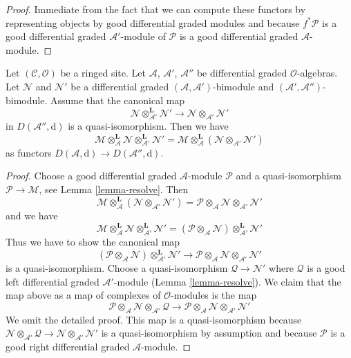 \begin{proof}
Immediate from the fact that we can compute these functors
by representing objects by good differential graded modules
and because $f^*\mathcal{P}$ is a good differential
graded $\mathcal{A}'$-module of $\mathcal{P}$ is a good
differential graded $\mathcal{A}$-module.
\end{proof}

\begin{lemma}
\label{lemma-compose-tensor}
Let $(\mathcal{C}, \mathcal{O})$ be a ringed site. Let
$\mathcal{A}$, $\mathcal{A}'$, $\mathcal{A}''$ be differential graded
$\mathcal{O}$-algebras. Let $\mathcal{N}$ and $\mathcal{N}'$ be a
differential graded $(\mathcal{A}, \mathcal{A}')$-bimodule
and $(\mathcal{A}', \mathcal{A}'')$-bimodule. Assume
that the canonical map
$$
\mathcal{N} \otimes_{\mathcal{A}'}^\mathbf{L} \mathcal{N}'
\longrightarrow
\mathcal{N} \otimes_{\mathcal{A}'} \mathcal{N}'
$$
in $D(\mathcal{A}'', \text{d})$ is a quasi-isomorphism.
Then we have
$$
\mathcal{M}
\otimes_\mathcal{A}^\mathbf{L} \mathcal{N} 
\otimes_{\mathcal{A}'}^\mathbf{L} \mathcal{N}'
=
\mathcal{M}
\otimes_\mathcal{A}^\mathbf{L}
(\mathcal{N} \otimes_{\mathcal{A}'} \mathcal{N}')
$$
as functors $D(\mathcal{A}, \text{d}) \to D(\mathcal{A}'', \text{d})$.
\end{lemma}

\begin{proof}
Choose a good differential graded $\mathcal{A}$-module
$\mathcal{P}$ and a quasi-isomorphism $\mathcal{P} \to \mathcal{M}$, see
Lemma \ref{lemma-resolve}. Then
$$
\mathcal{M}
\otimes_\mathcal{A}^\mathbf{L}
(\mathcal{N} \otimes_{\mathcal{A}'} \mathcal{N}') =
\mathcal{P} \otimes_\mathcal{A} \mathcal{N}
\otimes_{\mathcal{A}'} \mathcal{N}'
$$
and we have
$$
\mathcal{M}
\otimes_\mathcal{A}^\mathbf{L} \mathcal{N} 
\otimes_{\mathcal{A}'}^\mathbf{L} \mathcal{N}' =
(\mathcal{P} \otimes_\mathcal{A} \mathcal{N})
\otimes_{\mathcal{A}'}^\mathbf{L} \mathcal{N}'
$$
Thus we have to show the canonical map
$$
(\mathcal{P} \otimes_\mathcal{A} \mathcal{N})
\otimes_{\mathcal{A}'}^\mathbf{L} \mathcal{N}'
\longrightarrow
\mathcal{P} \otimes_\mathcal{A} \mathcal{N}
\otimes_{\mathcal{A}'} \mathcal{N}'
$$
is a quasi-isomorphism. Choose a quasi-isomorphism
$\mathcal{Q} \to \mathcal{N}'$ where $\mathcal{Q}$
is a good left differential graded $\mathcal{A}'$-module
(Lemma \ref{lemma-resolve}). We claim that the map
above as a map of complexes of $\mathcal{O}$-modules is the map
$$
\mathcal{P} \otimes_\mathcal{A} \mathcal{N}
\otimes_{\mathcal{A}'} \mathcal{Q}
\longrightarrow
\mathcal{P} \otimes_\mathcal{A} \mathcal{N}
\otimes_{\mathcal{A}'} \mathcal{N}'
$$
We omit the detailed proof. This map is a quasi-isomorphism
because $\mathcal{N} \otimes_{\mathcal{A}'} \mathcal{Q} \to
\mathcal{N} \otimes_{\mathcal{A}'} \mathcal{N}'$ is a quasi-isomorphism
by assumption and because $\mathcal{P}$ is a good right
differential graded $\mathcal{A}$-module.
\end{proof}



















